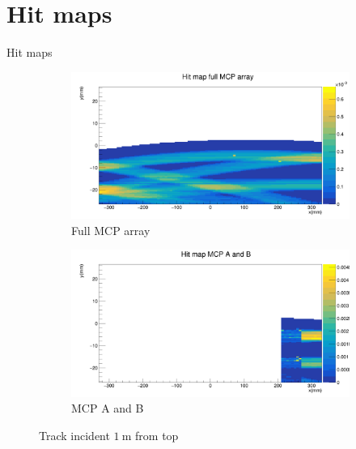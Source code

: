 \documentclass{beamer}
\begin{document}
\section{Hit maps}
\begin{frame}{Hit maps}
  \begin{figure}
    \centering
    \vspace{-0.2cm}
    \begin{subfigure}{0.5\textwidth}
      \includegraphics[width = 1.0\textwidth]{Plots/HitMapMCPFullMiddle.png}
      \caption{Full MCP array}
    \end{subfigure}%
    \begin{subfigure}{0.5\textwidth}
      \includegraphics[width = 1.0\textwidth]{Plots/HitMapMCPABMiddle.png}
      \caption{MCP A and B}
    \end{subfigure}
    \caption{Track incident $\SI{1}{\meter}$ from top}
  \end{figure}
\end{frame}
\end{document}
